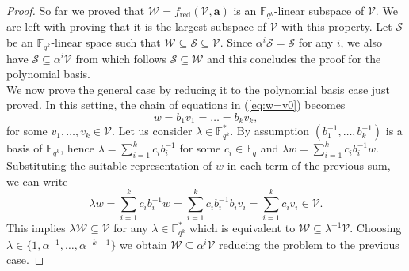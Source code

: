 \documentclass{article}
\newcommand{\Fq}{\mathbb{F}_{q}}
\newcommand{\Fqk}{\mathbb{F}_{q^k}}
\newcommand{\calS}{\mathcal{S}}
\newcommand{\calW}{\mathcal{W}}
\newcommand{\calV}{\mathcal{V}}
\newcommand{\fred}{f_{\mathrm{red}}}
\DeclareMathOperator{\Inv}{Inv}
\newcommand{\Span}[2]{\langle #2 \rangle_{#1}}
\begin{document}
\begin{proof}
    So far we proved that $\calW = \fred(\calV, \bm a)$ is an $\Fqk$-linear subspace of $\calV$. We are left with proving that it is the largest subspace of $\calV$ with this property.
    Let $\calS$ be an $\Fqk$-linear space such that $\calW \subseteq \calS \subseteq \calV$. Since $\alpha^i \calS = \calS$ for any $i$, we also have $\calS \subseteq \alpha^i \calV$ from which follows $\calS \subseteq \calW$ and this concludes the proof for the polynomial basis.
\\
    We now prove the general case by reducing it to the polynomial basis case just proved. In this setting, the chain of equations in (\ref{eq:w=v0}) becomes
    $$
        w = b_1 v_1 = \ldots = b_k v_k,
    $$
    for some $v_1,\ldots, v_k \in \calV$.
    Let us consider $\lambda\in\Fqk^*$. By assumption $(b_1^{-1}, \ldots, b_k^{-1})$ is a basis of $\Fqk$, hence $\lambda = \sum_{i=1}^{k} c_i b_i^{-1}$ for some $c_i \in \Fq$ and $\lambda w = \sum_{i=1}^k c_i b_i^{-1} w$. Substituting the suitable representation of $w$ in each term of the previous sum, we can write $$\lambda w = \sum_{i=1}^k c_i b_i^{-1} w = \sum_{i=1}^k c_i b_i^{-1} b_iv_i= \sum_{i=1}^k c_i v_i \in \calV.$$
    This implies $\lambda \calW \subseteq \calV$ for any $\lambda \in \Fqk^*$ which is equivalent to $\calW \subseteq \lambda^{-1} \calV$. 
    Choosing $\lambda \in\{ 1,\alpha^{-1},\ldots,\alpha^{-k+1}\}$ we obtain $\calW \subseteq \alpha^i \calV$ reducing the problem to the previous case.
\end{proof}

\end{document}
